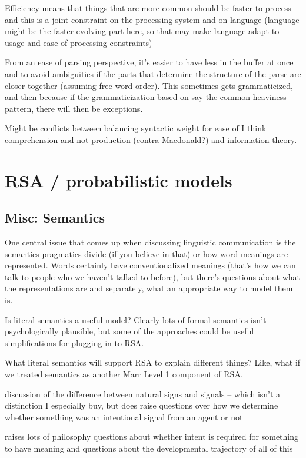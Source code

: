 \documentclass[]{article}
\begin{document}
Efficiency means that things that are more common should be faster to process and this is a joint constraint on the processing system and on language (language might be the faster evolving part here, so that may make language adapt to usage and ease of processing constraints)

From an ease of parsing perspective, it's easier to have less in the buffer at once and to avoid ambiguities if the parts that determine the structure of the parse are closer together (assuming free word order). This sometimes gets grammaticized, and then because if the grammaticization based on say the common heaviness pattern, there will then be exceptions. 

Might be conflicts between balancing syntactic weight for ease of I think comprehension and not production (contra Macdonald?) and information theory. 




\section{RSA / probabilistic models }
\subsection{Misc: Semantics}
One central issue that comes up when discussing linguistic communication is the semantics-pragmatics divide (if you believe in that) or how word meanings are represented. Words certainly have conventionalized meanings (that's how we can talk to people who we haven't talked to before), but there's questions about what the representations are and separately, what an appropriate way to model them is. 

Is literal semantics a useful model? Clearly lots of formal semantics isn't psychologically plausible, but some of the approaches could be useful simplifications for plugging in to RSA. 

What literal semantics will support RSA to explain different things? Like, what if we treated semantics as another Marr Level 1 component of RSA. 

\cite{clark1996}
discussion of the difference between natural signs and signals -- which isn't a distinction I especially buy, but does raise questions over how we determine whether something was an intentional signal from an agent or not 

raises lots of philosophy questions about whether intent is required for something to have meaning and questions about the developmental trajectory of all of this 
\end{document}
